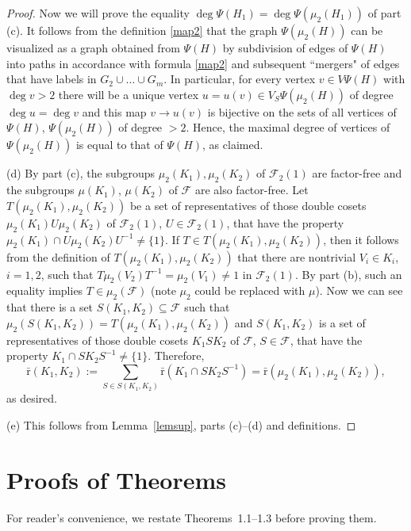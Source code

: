 \documentclass[10pt, reqno]{amsart}
\numberwithin{equation}{section}
\begin{document}
\begin{proof}
Now we will prove the equality  $\deg \Psi(H_1) = \deg  \Psi(\mu_2(H_1))$ of part (c).
It follows from the definition  \eqref{map2} that the graph $\Psi(\mu_2(H))$
can be visualized as  a graph obtained from $\Psi(H)$ by subdivision of edges  of $\Psi(H)$ into paths in accordance with formula  \eqref{map2}  and subsequent ``mergers" of edges that have labels in $G_2 \cup \dots \cup G_{m}$. In particular, for every
vertex $v \in V \Psi(H)$ with   $\deg v >2$ there will be a unique vertex $u = u(v) \in V_S \Psi(\mu_2(H))$  of degree $\deg u = \deg v$ and this map $v \to u(v)$ is bijective on  the sets of all vertices of $\Psi(H)$, $\Psi(\mu_2(H))$    of  degree $> 2$. Hence, the maximal degree of vertices of  $\Psi(\mu_2(H))$ is equal to that of $\Psi(H)$, as claimed.
\smallskip

(d) By part (c), the subgroups  $\mu_2(K_1), \mu_2(K_2)$ of ${\mathcal{F}}_2(1)$ are  factor-free
and the subgroups  $\mu(K_1)$, $\mu(K_2)$  of ${\mathcal{F}}$ are also factor-free.
Let $T(\mu_2(K_1), \mu_2(K_2) )$ be a  set of representatives of those double cosets
$\mu_2(K_1) U \mu_2(K_2)$ of ${\mathcal{F}}_2(1)$, $U \in {\mathcal{F}}_2(1)$, that have the property
$\mu_2(K_1) \cap U \mu_2(K_2)U^{-1} \ne  \{ 1 \}$. If $T \in T(\mu_2(K_1), \mu_2(K_2) )$, then it follows from the definition    of   $T(\mu_2(K_1), \mu_2(K_2))$
that there are nontrivial
$V_i \in K_i$, $i =1,2$, such that $T \mu_2(V_2) T^{-1} = \mu_2(V_1) \ne 1$ in ${\mathcal{F}}_2(1)$.
By part (b), such an  equality  implies  $T \in \mu_2({\mathcal{F}})$ (note $\mu_2$ could be replaced with $\mu$).   Now we can see that
there is a set $S(K_1, K_2) \subseteq {\mathcal{F}}$ such that $\mu_2(S(K_1, K_2)) = T(\mu_2(K_1), \mu_2(K_2) )$ and $S(K_1, K_2) $ is   a set of representatives of those double cosets $K_1 S K_2$ of ${\mathcal{F}}$, $S \in {\mathcal{F}}$, that have the property $K_1 \cap S K_2 S^{-1} \ne  \{ 1 \}$. Therefore,
$$
{\bar {\mathrm{r}}}(K_1, K_2)   := \sum_{S \in S(K_1, K_2)}  {\bar {\mathrm{r}}}( K_1 \cap S K_2 S^{-1}) =
{\bar {\mathrm{r}}}(  \mu_2(K_1) , \mu_2(K_2) )  ,
$$
as desired.
\smallskip

(e)  This follows from  Lemma~\ref{lemsup}, parts (c)--(d) and definitions.
\end{proof}

\section{Proofs of Theorems}

For reader's convenience, we restate Theorems~1.1--1.3 before proving them.
\end{document}
